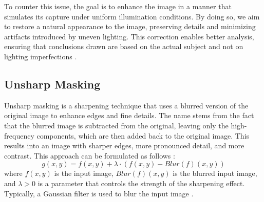 \documentclass[sigconf]{acmart}
\begin{document}
To counter this issue, the goal is to enhance the image in a manner that simulates its capture under uniform illumination conditions. By doing so, we aim to restore a natural appearance to the image, preserving details and minimizing artifacts introduced by uneven lighting. This correction enables better analysis, ensuring that conclusions drawn are based on the actual subject and not on lighting imperfections \cite{dey2019uneven}.

\subsection{Unsharp Masking}\label{sec:unsharp}
Unsharp masking is a sharpening technique that uses a blurred version of the original image to enhance edges and fine details. The name stems from the fact that the blurred image is subtracted from the original, leaving only the high-frequency components, which are then added back to the original image. This results into an image with sharper edges, more pronounced detail, and more contrast. This approach can be formulated as follows \cite{shi2021unsharp,morishita1988unsharp,deng2010generalized}:
\begin{equation}
	g(x,y) = f(x,y) + \lambda \cdot (f(x,y) - Blur(f)(x,y))
\end{equation}
where $f(x,y)$ is the input image, $Blur(f)(x,y)$ is the blurred input image, and $\lambda > 0$ is a parameter that controls the strength of the sharpening effect. Typically, a Gaussian filter is used to blur the input image \cite{shi2021unsharp,morishita1988unsharp,deng2010generalized}.
\end{document}

